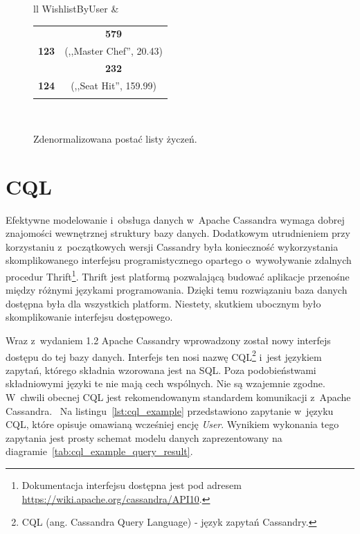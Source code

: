 \begin{figure}[ht!]
	\centering

	\begin{tabular}{ll}
		WishlistByUser &
		\begin{tabular}{|l||c|}
			\hhline{|-||-|}
			& \textbf{579} \\
			\hhline{|~||=|}
			\textbf{123} & (,,Master Chef'', 20.43) \\
			\hhline{=::=}
			& \textbf{232} \\
			\hhline{|~||=|}
			\textbf{124} & (,,Seat Hit'', 159.99) \\
			\hhline{|-||-|}
		\end{tabular} \\
	\end{tabular}

	\caption{Zdenormalizowana postać listy życzeń.}
	\label{tab:denormalized_wishlist}
\end{figure}

\section{CQL}
\label{sec:about_cql}

Efektywne modelowanie i~obsługa danych w~Apache Cassandra wymaga dobrej znajomości wewnętrznej struktury bazy danych. Dodatkowym utrudnieniem przy korzystaniu z~początkowych wersji Cassandry była konieczność wykorzystania skomplikowanego interfejsu programistycznego opartego o~wywoływanie zdalnych procedur Thrift\footnote{Dokumentacja interfejsu dostępna jest pod adresem \url{https://wiki.apache.org/cassandra/API10}.}. Thrift jest platformą pozwalającą budować aplikacje przenośne między różnymi językami programowania. Dzięki temu rozwiązaniu baza danych dostępna była dla wszystkich platform. Niestety, skutkiem ubocznym było skomplikowanie interfejsu dostępowego.

Wraz z~wydaniem 1.2 Apache Cassandry wprowadzony został nowy interfejs dostępu do tej bazy danych. Interfejs ten nosi nazwę CQL\footnote{CQL (ang. Cassandra Query Language) - język zapytań Cassandry.} i~jest językiem zapytań, którego składnia wzorowana jest na SQL. Poza podobieństwami składniowymi języki te nie mają cech wspólnych. Nie są wzajemnie zgodne. W~chwili obecnej CQL jest rekomendowanym standardem komunikacji z~Apache Cassandra.~\cite{cql_preferred_over_thrift} Na listingu~\ref{lst:cql_example} przedstawiono zapytanie w~języku CQL, które opisuje omawianą wcześniej encję \emph{User}. Wynikiem wykonania tego zapytania jest prosty schemat modelu danych zaprezentowany na diagramie~\ref{tab:cql_example_query_result}.

